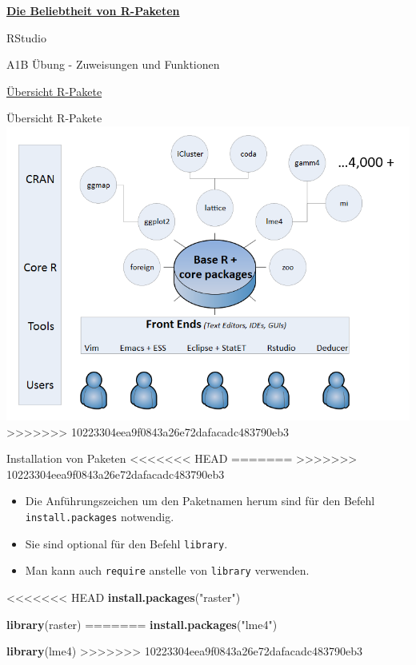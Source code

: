 \documentclass[ignorenonframetext,]{beamer}
\newenvironment{Shaded}{\begin{snugshade}}{\end{snugshade}}
\newcommand{\KeywordTok}[1]{\textcolor[rgb]{0.13,0.29,0.53}{\textbf{#1}}}
\newcommand{\StringTok}[1]{\textcolor[rgb]{0.31,0.60,0.02}{#1}}
\newcommand{\NormalTok}[1]{#1}
\newcommand{\KeywordTok}[1]{\textcolor[rgb]{0.13,0.29,0.53}{\textbf{#1}}}
\newcommand{\NormalTok}[1]{#1}
\newcommand{\StringTok}[1]{\textcolor[rgb]{0.31,0.60,0.02}{#1}}
\providecommand{\tightlist}{%
  \setlength{\itemsep}{0pt}\setlength{\parskip}{0pt}}
\begin{document}
\begin{frame}{\href{https://gallery.shinyapps.io/cran-gauge/}{\textbf{Die
Beliebtheit von R-Paketen}}}
\begin{frame}{RStudio}
\begin{frame}[fragile]{A1B Übung - Zuweisungen und Funktionen}
\begin{frame}{\href{https://www.youtube.com/watch?v=kKI9--Opmso}{Übersicht
R-Pakete}}
\begin{frame}{Übersicht R-Pakete}
\includegraphics{figure/Packages.PNG}
>>>>>>> 10223304eea9f0843a26e72dafacadc483790eb3

\end{frame}

\begin{frame}[fragile]{Installation von Paketen}
<<<<<<< HEAD
=======
\protect\hypertarget{installation-von-paketen}{}
>>>>>>> 10223304eea9f0843a26e72dafacadc483790eb3

\begin{itemize}
\tightlist
\item
  Die Anführungszeichen um den Paketnamen herum sind für den Befehl
  \texttt{install.packages} notwendig.
\item
  Sie sind optional für den Befehl \texttt{library}.
\item
  Man kann auch \texttt{require} anstelle von \texttt{library}
  verwenden.
\end{itemize}

\begin{Shaded}
\begin{Highlighting}[]
<<<<<<< HEAD
\KeywordTok{install.packages}\NormalTok{(}\StringTok{"raster"}\NormalTok{)}

\KeywordTok{library}\NormalTok{(raster)}
=======
\KeywordTok{install.packages}\NormalTok{(}\StringTok{"lme4"}\NormalTok{)}

\KeywordTok{library}\NormalTok{(lme4)}
>>>>>>> 10223304eea9f0843a26e72dafacadc483790eb3
\end{Highlighting}
\end{Shaded}

\end{frame}


\end{frame}
\end{frame}
\end{frame}
\end{frame}
\end{document}
